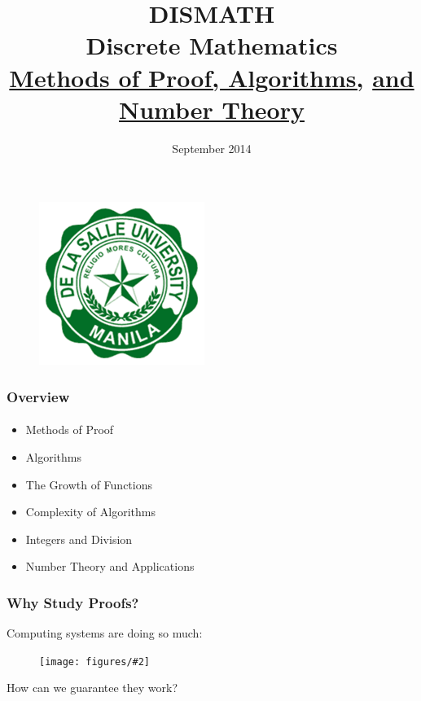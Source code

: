 \documentclass{beamer}
\newcommand{\ns}{\vspace{-0.5cm}}  %
\newcommand{\fig}[2]{
\begin{center}
\begin{figure}
\texttt{[image: figures/\#2]}
\end{figure}
\end{center}
}
\begin{document}
\ECFAugie

\begin{frame}

\begin{center}
\begin{figure}
\includegraphics[scale=0.3]{figures/dlsulogo}
\end{figure}
\end{center}
\ns

\title{DISMATH \\ Discrete Mathematics \\ \underline{Methods of Proof, Algorithms,} 
\underline{ and Number Theory}}
 
\date{September 2014}
\maketitle
\end{frame}

\begin{frame}
\frametitle{Overview}
\framesubtitle{}
\begin{itemize} 
\huge
\item <1-> Methods of Proof
\item <2-> Algorithms
\item <3-> The Growth of Functions
\item <4-> Complexity of Algorithms
\item <5-> Integers and Division
\item <6-> Number Theory and Applications
\end{itemize}
\end{frame}


\begin{frame}
\frametitle{Why Study Proofs?}
\Large
 \quad Computing systems are doing so much:
\fig{0.55}{proof_tech}
\qquad How can we guarantee they work?
\end{frame}
\end{document}
